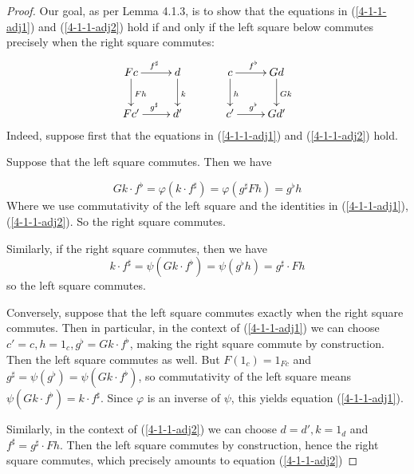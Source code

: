 \documentclass[../../solutions]{subfiles}
\begin{document}
\begin{proof}
Our goal, as per Lemma 4.1.3, is to show that the equations in (\ref{4-1-1-adj1}) and (\ref{4-1-1-adj2}) hold if and only if the left square below commutes precisely when the right square commutes:
\[
\xymatrix{
 Fc\ar[d]^{Fh} \ar[r]^{f^\sharp} & d \ar[d]^{k}\\
 Fc'\ar[r]^{g^\sharp} & d'
} \ \ \ \ \ \ \ \ \ 
\xymatrix{
 c\ar[d]^{h} \ar[r]^{f^\flat} & Gd \ar[d]^{Gk}\\
 c'\ar[r]^{g^\flat} & Gd'
} 
\]
Indeed, suppose first that the equations in (\ref{4-1-1-adj1}) and (\ref{4-1-1-adj2}) hold.

Suppose that the left square commutes. Then we have

\[
Gk \cdot f^\flat = \varphi(k \cdot f^\sharp) = \varphi(g^\sharp Fh) = g^\flat h 
\]
Where we use commutativity of the left square and the identities in (\ref{4-1-1-adj1}), (\ref{4-1-1-adj2}). So the right square commutes. 

Similarly, if the right square commutes, then we have
\[
k \cdot f^\sharp = \psi(Gk \cdot f^\flat) = \psi (g^\flat h) = g^\sharp \cdot Fh
\]
so the left square commutes.

Conversely, suppose that the left square commutes exactly when the right square commutes. Then in particular, in the context of (\ref{4-1-1-adj1}) we can choose $c' = c, h = 1_{c}, g^\flat =Gk \cdot f^\flat$, making the right square commute by construction. Then the left square commutes as well. But $F(1_c)=1_{Fc}$ and $g^\sharp = \psi(g^\flat)=\psi(Gk\cdot f^\flat)$, so commutativity of the left square means $\psi(Gk\cdot f^\flat) = k\cdot f^\sharp$. Since $\varphi$ is an inverse of $\psi$, this yields equation (\ref{4-1-1-adj1}). 

Similarly, in the context of (\ref{4-1-1-adj2}) we can choose $d = d', k = 1_d$ and $f^\sharp = g^\sharp \cdot Fh$. Then the left square commutes by construction, hence the right square commutes, which precisely amounts to equation (\ref{4-1-1-adj2})
\end{proof}
\end{document}
